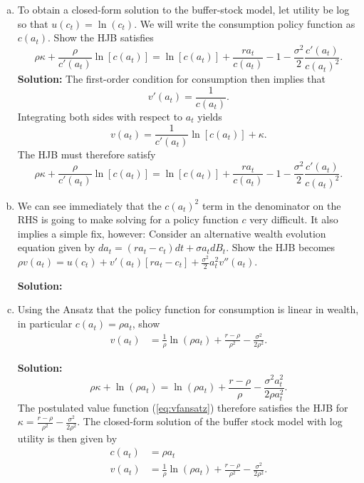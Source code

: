 \documentclass[11pt]{extarticle}
\theoremstyle{plain}
\theoremstyle{definition}
\begin{document}
\begin{enumerate}[(a)]
\item To obtain a closed-form solution to the buffer-stock model, let utility be log so that $u(c_t) = \ln(c_t)$. We will write the consumption policy function as $c(a_t)$. Show the HJB satisfies
\begin{equation*}
	\rho \kappa + \frac{\rho}{c'(a_t)} \ln[c(a_t)] = \ln[c(a_t)] + \frac{r a_t}{c(a_t)} - 1 - \frac{\sigma^2}{2} \frac{c'(a_t)}{c(a_t)^2}.
\end{equation*}
\textbf{Solution:}
The first-order condition for consumption then implies that 
\begin{equation}
	v'(a_t) = \frac{1}{c(a_t)}.
\end{equation}
Integrating both sides with respect to $a_t$ yields
\begin{equation}\label{eq:vfansatz}
	v(a_t) = \frac{1}{c'(a_t)} \ln[c(a_t)] + \kappa.
\end{equation}
The HJB must therefore satisfy 
\begin{equation*}
	\rho \kappa + \frac{\rho}{c'(a_t)} \ln[c(a_t)] = \ln[c(a_t)] + \frac{r a_t}{c(a_t)} - 1 - \frac{\sigma^2}{2} \frac{c'(a_t)}{c(a_t)^2}.
\end{equation*}

\item  We can see immediately that the $c(a_t)^2$ term in the denominator on the RHS is going to make solving for a policy function $c$ very difficult. It also implies a simple fix, however: Consider an alternative wealth evolution equation given by $da_t = (r a_t - c_t)dt + \sigma a_t dB_t$.  Show the HJB becomes $\rho v(a_t) = u(c_t) + v'(a_t)[ra_t -c_t] + \frac{\sigma^2}{2} a_t^2 v''(a_t)$. 

\textbf{Solution:}

\item Using the Ansatz that the policy function for consumption is linear in wealth, in particular $c(a_t) = \rho a_t$, show \begin{align}
	v(a_t) &= \frac{1}{\rho} \ln(\rho a_t) + \frac{r - \rho}{\rho^2} - \frac{\sigma^2}{2\rho^2}.
\end{align} 

\textbf{Solution:}
\begin{equation*}
	\rho \kappa + \ln(\rho a_t) = \ln(\rho a_t) + \frac{r-\rho}{\rho} - \frac{\sigma^2a_t^2}{2 \rho a_t^2}.
\end{equation*}
The postulated value function (\ref{eq:vfansatz}) therefore satisfies the HJB for $\kappa = \frac{r - \rho}{\rho^2} - \frac{\sigma^2}{2\rho^2}$. The closed-form solution of the buffer stock model with log utility is then given by 
\begin{align}
	c(a_t) &= \rho a_t \\
	v(a_t) &= \frac{1}{\rho} \ln(\rho a_t) + \frac{r - \rho}{\rho^2} - \frac{\sigma^2}{2\rho^2}.
\end{align} 


\end{enumerate}
\end{document}
